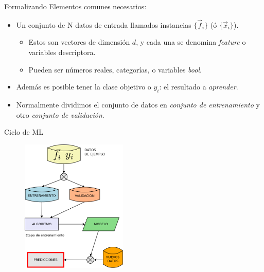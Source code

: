 \documentclass[11pt]{beamer}
\begin{document}
\begin{frame}{Formalizando}
Elementos comunes necesarios:
\begin{itemize}
    \item Un conjunto de N datos de entrada llamados instancias $\{\vec{f}_i\}$ (\'o $\{\vec{x}_i\}$).
    \begin{itemize}
        \item Estos son vectores de dimensi\'on $d$, y cada una se denomina \textit{feature} o variables descriptora.
        \item Pueden ser n\'umeros reales, categor\'ias, o variables \textit{bool}.
    \end{itemize}
    \item Adem\'as es posible tener la clase objetivo o $y_i$: el resultado a \textit{aprender}.
    \item Normalmente dividimos el conjunto de datos en \textit{conjunto de entrenamiento} y otro \textit{conjunto de validaci\'on}.
\end{itemize}
\end{frame}
\begin{frame}{Ciclo de ML}
\begin{figure}
    \centering
\includegraphics[width=0.45\textwidth]{images/ml_cycle.png}
    \label{fig:ml_cycle}
\end{figure}
\end{frame}
\end{document}
